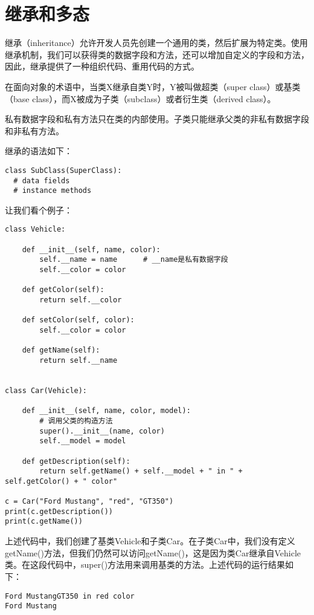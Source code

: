 \section{继承和多态}

继承（inheritance）允许开发人员先创建一个通用的类，然后扩展为特定类。使用继承机制，我们可以获得类的数据字段和方法，还可以增加自定义的字段和方法，因此，继承提供了一种组织代码、重用代码的方式。

在面向对象的术语中，当类X继承自类Y时，Y被叫做超类（super class）或基类（base class），而X被成为子类（subclass）或者衍生类（derived class）。
\begin{myremark}{}
私有数据字段和私有方法只在类的内部使用。子类只能继承父类的非私有数据字段和非私有方法。
\end{myremark}

继承的语法如下：

\begin{lstlisting}
class SubClass(SuperClass):
  # data fields
  # instance methods
\end{lstlisting}

让我们看个例子：

\begin{lstlisting}
class Vehicle:

    def __init__(self, name, color):
        self.__name = name      # __name是私有数据字段
        self.__color = color

    def getColor(self):
        return self.__color

    def setColor(self, color):
        self.__color = color

    def getName(self):
        return self.__name


class Car(Vehicle):

    def __init__(self, name, color, model):
        # 调用父类的构造方法
        super().__init__(name, color)
        self.__model = model

    def getDescription(self):
        return self.getName() + self.__model + " in " + self.getColor() + " color"

c = Car("Ford Mustang", "red", "GT350")
print(c.getDescription())
print(c.getName())
\end{lstlisting}

上述代码中，我们创建了基类Vehicle和子类Car。在子类Car中，我们没有定义getName()方法，但我们仍然可以访问getName()，这是因为类Car继承自Vehicle类。在这段代码中，super()方法用来调用基类的方法。上述代码的运行结果如下：

\begin{lstlisting}
Ford MustangGT350 in red color
Ford Mustang
\end{lstlisting}

